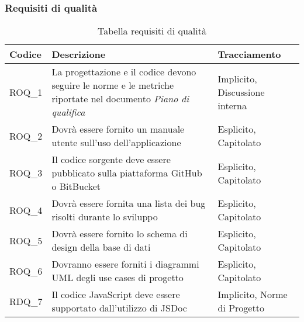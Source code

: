 \subsubsection{Requisiti di qualità}\label{subsec:requisiti_qualita}
\begin{xltabular}{\textwidth}{ p{0.1\textwidth} | X | p{0.3\textwidth} }
    \textbf{\color{white} Codice} & \textbf{\color{white} Descrizione} & \textbf{\color{white} Tracciamento} \\ 
    \endhead

    \caption{Tabella requisiti di qualità}
    \endlastfoot

    ROQ\_1 & La progettazione e il codice devono seguire le norme e le metriche riportate nel documento \textit{Piano di qualifica} & Implicito, Discussione interna \\
    ROQ\_2 & Dovrà essere fornito un manuale utente sull'uso dell'applicazione & Esplicito, Capitolato \\
    ROQ\_3 & Il codice sorgente deve essere pubblicato sulla piattaforma GitHub o BitBucket & Esplicito, Capitolato \\
    ROQ\_4 & Dovrà essere fornita una lista dei bug risolti durante lo sviluppo & Esplicito, Capitolato \\ 
    ROQ\_5 & Dovrà essere fornito lo schema di design della base di dati & Esplicito, Capitolato \\ 
    ROQ\_6 & Dovranno essere forniti i diagrammi UML degli use cases di progetto & Esplicito, Capitolato \\ 
    RDQ\_7 & Il codice JavaScript deve essere supportato dall'utilizzo di JSDoc & Implicito, Norme di Progetto \\
    \hline
\end{xltabular}


